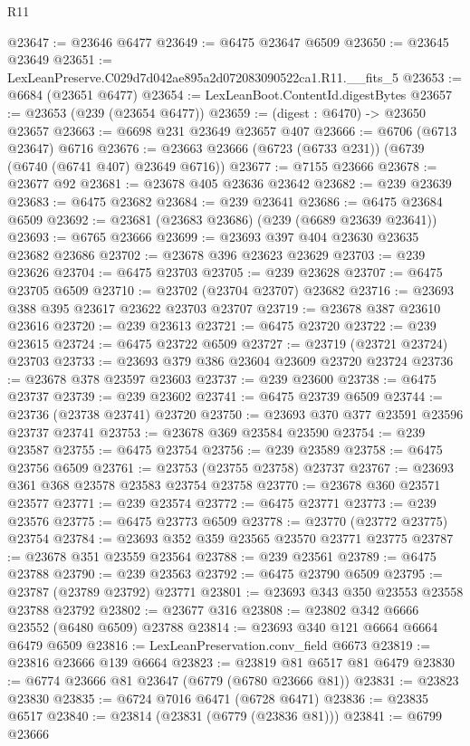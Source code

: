 \begin{lexlean}{R11}
\begin{coremodule}
@23647 := @23646 @6477
@23649 := @6475 @23647 @6509
@23650 := @23645 @23649
@23651 := LexLeanPreserve.C029d7d042ae895a2d072083090522ca1.R11.__fits_5
@23653 := @6684 (@23651 @6477)
@23654 := LexLeanBoot.ContentId.digestBytes
@23657 := @23653 (@239 (@23654 @6477))
@23659 := (digest : @6470) -> @23650 @23657
@23663 := @6698 @231 @23649 @23657 @407
@23666 := @6706 (@6713 @23647) @6716
@23676 := @23663 @23666 (@6723 (@6733 @231)) (@6739 (@6740 (@6741 @407) @23649 @6716))
@23677 := @7155 @23666
@23678 := @23677 @92
@23681 := @23678 @405 @23636 @23642
@23682 := @239 @23639
@23683 := @6475 @23682
@23684 := @239 @23641
@23686 := @6475 @23684 @6509
@23692 := @23681 (@23683 @23686) (@239 (@6689 @23639 @23641))
@23693 := @6765 @23666
@23699 := @23693 @397 @404 @23630 @23635 @23682 @23686
@23702 := @23678 @396 @23623 @23629
@23703 := @239 @23626
@23704 := @6475 @23703
@23705 := @239 @23628
@23707 := @6475 @23705 @6509
@23710 := @23702 (@23704 @23707) @23682
@23716 := @23693 @388 @395 @23617 @23622 @23703 @23707
@23719 := @23678 @387 @23610 @23616
@23720 := @239 @23613
@23721 := @6475 @23720
@23722 := @239 @23615
@23724 := @6475 @23722 @6509
@23727 := @23719 (@23721 @23724) @23703
@23733 := @23693 @379 @386 @23604 @23609 @23720 @23724
@23736 := @23678 @378 @23597 @23603
@23737 := @239 @23600
@23738 := @6475 @23737
@23739 := @239 @23602
@23741 := @6475 @23739 @6509
@23744 := @23736 (@23738 @23741) @23720
@23750 := @23693 @370 @377 @23591 @23596 @23737 @23741
@23753 := @23678 @369 @23584 @23590
@23754 := @239 @23587
@23755 := @6475 @23754
@23756 := @239 @23589
@23758 := @6475 @23756 @6509
@23761 := @23753 (@23755 @23758) @23737
@23767 := @23693 @361 @368 @23578 @23583 @23754 @23758
@23770 := @23678 @360 @23571 @23577
@23771 := @239 @23574
@23772 := @6475 @23771
@23773 := @239 @23576
@23775 := @6475 @23773 @6509
@23778 := @23770 (@23772 @23775) @23754
@23784 := @23693 @352 @359 @23565 @23570 @23771 @23775
@23787 := @23678 @351 @23559 @23564
@23788 := @239 @23561
@23789 := @6475 @23788
@23790 := @239 @23563
@23792 := @6475 @23790 @6509
@23795 := @23787 (@23789 @23792) @23771
@23801 := @23693 @343 @350 @23553 @23558 @23788 @23792
@23802 := @23677 @316
@23808 := @23802 @342 @6666 @23552 (@6480 @6509) @23788
@23814 := @23693 @340 @121 @6664 @6664 @6479 @6509
@23816 := LexLeanPreservation.conv_field @6673
@23819 := @23816 @23666 @139 @6664
@23823 := @23819 @81 @6517 @81 @6479
@23830 := @6774 @23666 @81 @23647 (@6779 (@6780 @23666 @81))
@23831 := @23823 @23830
@23835 := @6724 @7016 @6471 (@6728 @6471)
@23836 := @23835 @6517
@23840 := @23814 (@23831 (@6779 (@23836 @81)))
@23841 := @6799 @23666

\end{coremodule}
\end{lexlean}
